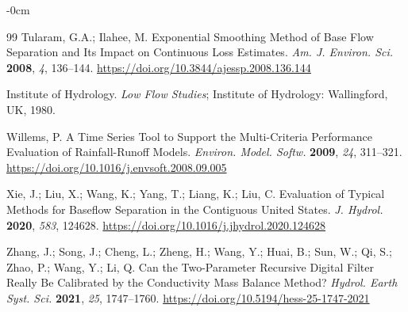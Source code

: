 \documentclass[hydrology,article,submit,pdftex,moreauthors]{Definitions/mdpi}
\begin{document}
\begin{adjustwidth}{-\extralength}{0cm}
\begin{thebibliography}{99}
Tularam, G.A.; Ilahee, M. Exponential Smoothing Method of Base Flow Separation and Its Impact on Continuous Loss Estimates. \textit{Am. J. Environ. Sci.} \textbf{2008}, \textit{4}, 136--144. \url{https://doi.org/10.3844/ajessp.2008.136.144}

Institute of Hydrology. \textit{Low Flow Studies}; Institute of Hydrology: Wallingford, UK, 1980.

Willems, P. A Time Series Tool to Support the Multi-Criteria Performance Evaluation of Rainfall-Runoff Models. \textit{Environ. Model. Softw.} \textbf{2009}, \textit{24}, 311--321. \url{https://doi.org/10.1016/j.envsoft.2008.09.005}

Xie, J.; Liu, X.; Wang, K.; Yang, T.; Liang, K.; Liu, C. Evaluation of Typical Methods for Baseflow Separation in the Contiguous United States. \textit{J. Hydrol.} \textbf{2020}, \textit{583}, 124628. \url{https://doi.org/10.1016/j.jhydrol.2020.124628}

Zhang, J.; Song, J.; Cheng, L.; Zheng, H.; Wang, Y.; Huai, B.; Sun, W.; Qi, S.; Zhao, P.; Wang, Y.; Li, Q. Can the Two-Parameter Recursive Digital Filter Really Be Calibrated by the Conductivity Mass Balance Method? \textit{Hydrol. Earth Syst. Sci.} \textbf{2021}, \textit{25}, 1747--1760. \url{https://doi.org/10.5194/hess-25-1747-2021}

\end{thebibliography}

\end{adjustwidth}
\end{document}
